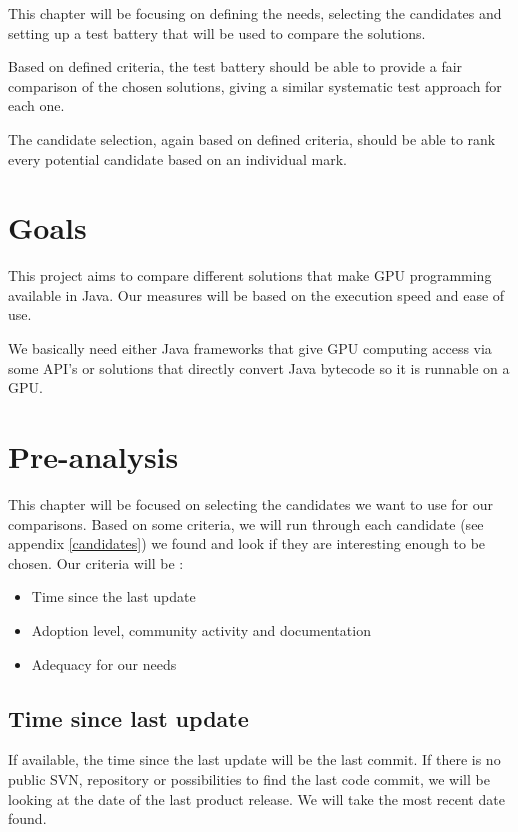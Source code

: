 This chapter will be focusing on defining the needs, selecting the candidates and setting up a test battery that will be used to compare the solutions.

Based on defined criteria, the test battery should be able to provide a fair comparison of the chosen solutions, giving a similar systematic test approach for each one.

The candidate selection, again based on defined criteria, should be able to rank every potential candidate based on an individual mark.

\section{Goals} \label{goals}

This project aims to compare different solutions that make GPU programming available in Java. Our measures will be based on the execution speed and ease of use.

We basically need either Java frameworks that give GPU computing access via some API's or solutions that directly convert Java bytecode so it is runnable on a GPU.

\section{Pre-analysis}

This chapter will be focused on selecting the candidates we want to use for our comparisons. Based on some criteria, we will run through each candidate (see appendix \ref{candidates}) we found and look if they are interesting enough to be chosen. Our criteria  will be :

\begin{itemize}
  \item Time since the last update
  \item Adoption level, community activity and documentation
  \item Adequacy for our needs
\end{itemize}


\subsection{Time since last update}

If available, the time since the last update will be the last commit. If there is no public SVN, repository or possibilities to find the last code commit, we will be looking at the date of the last product release. We will take the most recent date found.


